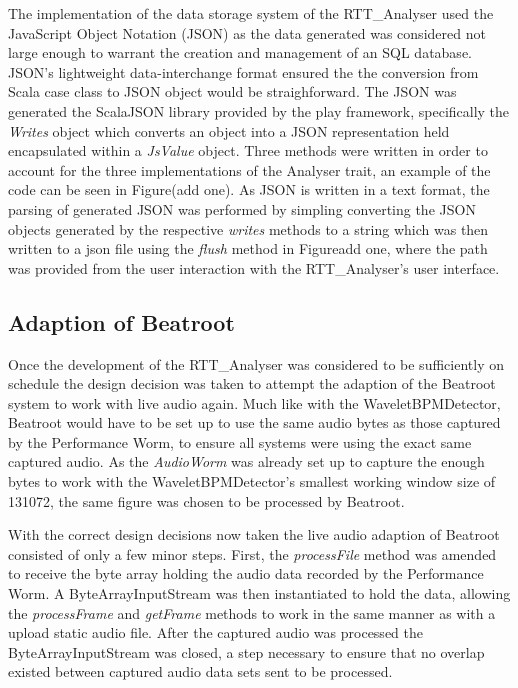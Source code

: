 \documentclass[a4paper, 11pt]{article}
\begin{document}
The implementation of the data storage system of the RTT_Analyser used the JavaScript Object Notation (JSON) as the data generated was considered not large enough to warrant the creation and management of an SQL database. JSON's lightweight data-interchange format\cite{json} ensured the the conversion from Scala case class to JSON object would be straighforward. The JSON was generated the ScalaJSON library provided by the play framework\cite{play}, specifically the \textit{Writes} object which converts an object into a JSON representation held encapsulated within a \textit{JsValue} object. Three methods were written in order to account for the three implementations of the Analyser trait, an example of the code can be seen in Figure(add one). As JSON is written in a text format\cite{json}, the parsing of generated JSON was performed by simpling converting the JSON objects generated by the respective \textit{writes} methods to a string which was then written to a json file using the \textit{flush} method in Figure{add one}, where the path was provided from the user interaction with the RTT_Analyser's user interface.


\subsection{Adaption of Beatroot}
Once the development of the RTT\_Analyser was considered to be sufficiently on schedule the design decision was taken to attempt the adaption of the Beatroot system to work with live audio again. Much like with the WaveletBPMDetector, Beatroot would have to be set up to use the same audio bytes as those captured by the Performance Worm, to ensure all systems were using the exact same captured audio. As the \textit{AudioWorm} was already set up to capture the enough bytes to work with the WaveletBPMDetector's smallest working window size of 131072, the same figure was chosen to be processed by Beatroot. \par
With the correct design decisions now taken the live audio adaption of Beatroot consisted of only a few minor steps. First, the \textit{processFile} method was amended to receive the byte array holding the audio data recorded by the Performance Worm. A ByteArrayInputStream was then instantiated to hold the data, allowing the \textit{processFrame} and \textit{getFrame} methods to work in the same manner as with a upload static audio file. After the captured audio was processed the ByteArrayInputStream was closed, a step necessary to ensure that no overlap existed between captured audio data sets sent to be processed.
\end{document}
